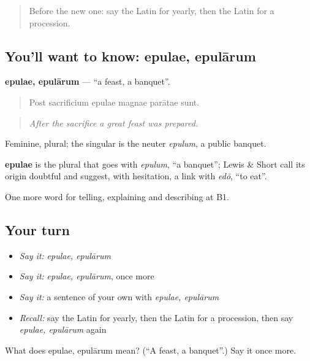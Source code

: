 \begin{quote}
Before the new one: say the Latin for yearly, then the Latin for a procession.
\end{quote}

\subsection*{You'll want to know: epulae, epulārum}
\textbf{epulae, epulārum} — \textquotedblleft{}a feast, a banquet\textquotedblright{}.

\begin{quote}
Post sacrificium epulae magnae parātae sunt.
\end{quote}

\begin{quote}
\emph{After the sacrifice a great feast was prepared.}
\end{quote}

Feminine, plural; the singular is the neuter \emph{epulum}, a public banquet.

\begin{cousinweb}
\textbf{epulae} is the plural that goes with \emph{epulum}, \textquotedblleft{}a banquet\textquotedblright{}; Lewis \& Short call its origin doubtful and suggest, with hesitation, a link with \emph{edō}, \textquotedblleft{}to eat\textquotedblright{}.
\end{cousinweb}

\begin{grammarlens}[title={What you've built}]
One more word for telling, explaining and describing at B1.
\end{grammarlens}

\subsection*{Your turn}
\begin{itemize}
\raggedright
  \item \emph{Say it:} \emph{epulae, epulārum}
  \item \emph{Say it:} \emph{epulae, epulārum}, once more
  \item \emph{Say it:} a sentence of your own with \emph{epulae, epulārum}
  \item \emph{Recall:} say the Latin for yearly, then the Latin for a procession, then say \emph{epulae, epulārum} again
\end{itemize}

\begin{tcolorbox}[breakable,colback=teal!4,colframe=teal!35!black,title={Before you move on}]
What does epulae, epulārum mean? (\textquotedblleft{}A feast, a banquet\textquotedblright{}.) Say it once more.
\end{tcolorbox}
